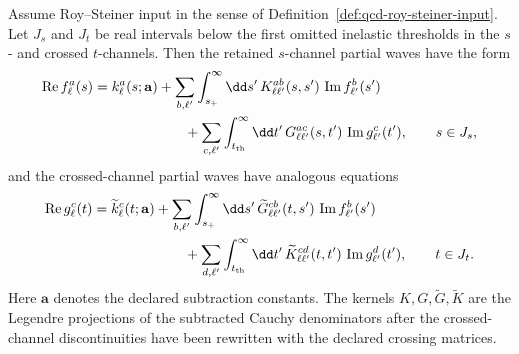 \begin{proposition}
\label{prop:qcd-roy-steiner-projection-construction}
Assume Roy--Steiner input in the sense of
Definition~\ref{def:qcd-roy-steiner-input}.  Let \(J_s\) and \(J_t\) be real
intervals below the first omitted inelastic thresholds in the \(s\)- and
crossed \(t\)-channels.  Then the retained \(s\)-channel partial waves have
the form
\begin{align}
  \operatorname{Re}f_\ell^a(s)
  &=
  k_\ell^a(s;\mathbf a)
  +
  \sum_{b,\ell'}
  \int_{s_+}^{\infty}\dd s'\,
  K_{\ell\ell'}^{ab}(s,s')\,\operatorname{Im}f_{\ell'}^b(s')
  \notag\\
  &\hspace{2.3cm}
  +
  \sum_{c,\ell'}
  \int_{t_{\rm th}}^{\infty}\dd t'\,
  G_{\ell\ell'}^{ac}(s,t')\,\operatorname{Im}g_{\ell'}^c(t'),
  \qquad s\in J_s,
  \label{eq:qcd-roy-steiner-s-channel-equation}
\end{align}
and the crossed-channel partial waves have analogous equations
\begin{align}
  \operatorname{Re}g_\ell^c(t)
  &=
  \widetilde k_\ell^c(t;\mathbf a)
  +
  \sum_{b,\ell'}
  \int_{s_+}^{\infty}\dd s'\,
  \widetilde G_{\ell\ell'}^{cb}(t,s')\,\operatorname{Im}f_{\ell'}^b(s')
  \notag\\
  &\hspace{2.3cm}
  +
  \sum_{d,\ell'}
  \int_{t_{\rm th}}^{\infty}\dd t'\,
  \widetilde K_{\ell\ell'}^{cd}(t,t')\,\operatorname{Im}g_{\ell'}^d(t'),
  \qquad t\in J_t.
  \label{eq:qcd-roy-steiner-t-channel-equation}
\end{align}
Here \(\mathbf a\) denotes the declared subtraction constants.  The kernels
\(K,G,\widetilde G,\widetilde K\) are the Legendre projections of the
subtracted Cauchy denominators after the crossed-channel discontinuities have
been rewritten with the declared crossing matrices.
\end{proposition}

